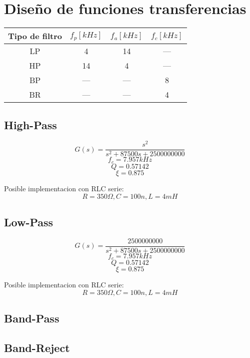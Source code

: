 \section{Dise\~no de funciones transferencias}\begin{tabular}{|c|c|c|c|}
\hline 
Tipo de filtro & $f_p[kHz]$ & $f_a[kHz]$ & $f_c[kHz]$ \\ 
\hline 
LP & 4   & 14  & --- \\ 
\hline 
HP & 14  & 4   & --- \\ 
\hline 
BP & --- & --- & 8   \\ 
\hline 
BR & --- & --- & 4   \\ 
\hline 
\end{tabular} 



\subsection{High-Pass}

\[G(s)=\frac{s^2}{s^2+87500s+2500000000}\]
\[f_c=7.957kHz\]
\[Q=0.57142\]
\[\xi=0.875\]

Posible implementacion con RLC serie:
\[R=350\Omega, C=100n, L=4mH\]

\subsection{Low-Pass}



\[G(s)=	\frac{2500000000}{s^2+87500s+2500000000}\]
\[f_c=7.957kHz\]
\[Q=0.57142\]
\[\xi=0.875\]

Posible implementacion con RLC serie:
\[R=350\Omega, C=100n, L=4mH\]

\subsection{Band-Pass}

\subsection{Band-Reject}